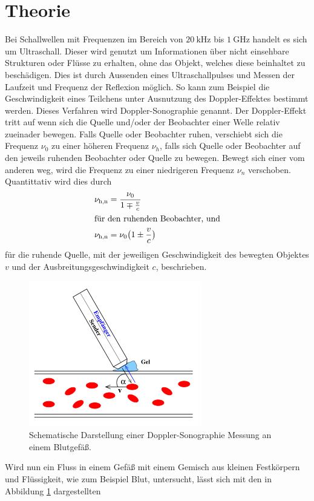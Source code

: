 \section{Theorie}
\label{sec:Theorie}
Bei Schallwellen mit Frequenzen im Bereich von $\SI{20}{\kilo\hertz}$ bis $\SI{1}{\giga\hertz}$ handelt es sich um Ultraschall. Dieser wird genutzt um Informationen über nicht einsehbare
Strukturen oder Flüsse zu erhalten, ohne das Objekt, welches diese beinhaltet zu beschädigen. Dies ist durch Aussenden eines Ultraschallpulses und Messen der Laufzeit und Frequenz der Reflexion
möglich. So kann zum Beispiel die Geschwindigkeit eines Teilchens unter Ausnutzung des Doppler-Effektes bestimmt werden. Dieses Verfahren wird Doppler-Sonographie genannt.
Der Doppler-Effekt tritt auf wenn sich die Quelle und/oder der Beobachter einer
Welle relativ zueinader bewegen. Falls Quelle oder Beobachter ruhen, verschiebt sich die Frequenz $\nu_0$ zu einer höheren Frequenz $\nu_h$, falls sich Quelle oder Beobachter auf den jeweils ruhenden
Beobachter oder Quelle zu bewegen. Bewegt sich einer vom anderen weg, wird die Frequenz zu einer niedrigeren Frequenz $\nu_n$ verschoben. Quantittativ wird dies durch
\begin{align}
  \nu_\text{h,n} &= \frac{\nu_0}{1\mp\frac{v}{c}}\\
  \intertext{für den ruhenden Beobachter, und}
  \nu_\text{h,n} &= \nu_0 \bigl(1\pm\frac{v}{c}\bigr)
\end{align}
für die ruhende Quelle, mit der jeweiligen Geschwindigkeit des bewegten Objektes $v$ und der Ausbreitungsgeschwindigkeit $c$, beschrieben.
\begin{figure}
  \centering
  \includegraphics{images/dopplerfluss.png}
  \caption{Schematische Darstellung einer Doppler-Sonographie Messung an einem Blutgefäß.\cite{sample}}
  \label{fig:dopplerfluss}
\end{figure}
Wird nun ein Fluss in einem Gefäß mit einem Gemisch aus kleinen Festkörpern und Flüssigkeit, wie zum Beispiel Blut, untersucht, lässt sich mit den in Abbildung \ref{fig:dopplerfluss} dargestellten
